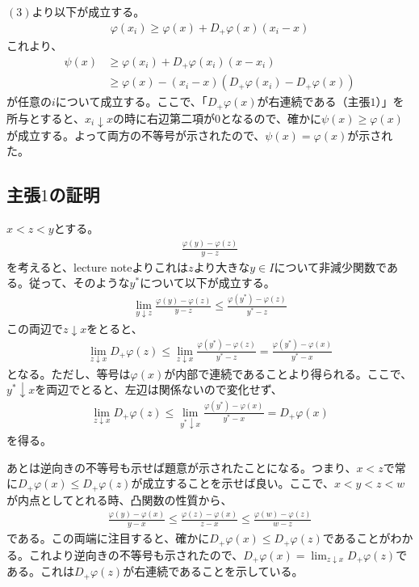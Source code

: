\documentclass{article}
\begin{document}
$(3)$より以下が成立する。
\begin{align*}
	\varphi(x_i) \geq \varphi(x) + D_{+}\varphi(x) (x_i - x)
\end{align*}
これより、
\begin{align*}
	\psi(x) &\geq \varphi(x_i) + D_{+}\varphi(x_i) (x - x_i)\\
	&\geq \varphi(x) - (x_i - x) (D_{+}\varphi(x_i) - D_{+}\varphi(x))
\end{align*}
が任意の$i$について成立する。ここで、「$D_{+} \varphi(x)$が右連続である（主張$1$）」を所与とすると、$x_i \downarrow x$の時に右辺第二項が$0$となるので、確かに$\psi(x) \geq \varphi(x)$が成立する。よって両方の不等号が示されたので、$\psi(x) =  \varphi(x)$が示された。

\subsection{主張$1$の証明}
$x < z < y$とする。
\begin{align*}
	\frac{\varphi(y) - \varphi(z)}{y-z}
\end{align*}
を考えると、lecture noteよりこれは$z$より大きな$y \in I$について非減少関数である。従って、そのような$y^{*}$について以下が成立する。
\begin{align*}
	\lim_{y\downarrow z} \frac{\varphi(y) -\varphi(z)}{y-z} \leq \frac{\varphi(y^{*})- \varphi(z)}{y^{*}-z}
\end{align*}
この両辺で$z\downarrow x$をとると、
\begin{align*}
	\lim_{z\downarrow x} D_{+}\varphi(z) \leq \lim_{z\downarrow x} \frac{\varphi(y^{*})- \varphi(z)}{y^{*}-z} = \frac{\varphi(y^{*})- \varphi(x)}{y^{*}-x}
\end{align*}
となる。ただし、等号は$\varphi(x)$が内部で連続であることより得られる。ここで、$y^{*} \downarrow x$を両辺でとると、左辺は関係ないので変化せず、
\begin{align*}
	\lim_{z\downarrow x} D_{+}\varphi(z) \leq \lim_{y^{*} \downarrow x} \frac{\varphi(y^{*})- \varphi(x)}{y^{*}-x} = D_{+}\varphi(x)
\end{align*}
を得る。

あとは逆向きの不等号も示せば題意が示されたことになる。つまり、$x < z$で常に$D_{+}\varphi(x) \leq D_{+}\varphi(z)$が成立することを示せば良い。ここで、$x < y < z < w$が内点としてとれる時、凸関数の性質から、
\begin{align*}
	\frac{\varphi(y) - \varphi(x)}{y-x} \leq \frac{\varphi(z) - \varphi(x)}{z-x} \leq \frac{\varphi(w) - \varphi(z)}{w-z}
\end{align*}
である。この両端に注目すると、確かに$D_{+}\varphi(x) \leq D_{+}\varphi(z)$であることがわかる。これより逆向きの不等号も示されたので、$D_{+}\varphi(x) = \lim_{z\downarrow x} D_{+}\varphi(z)$である。これは$D_{+}\varphi(z)$が右連続であることを示している。
\end{document}

